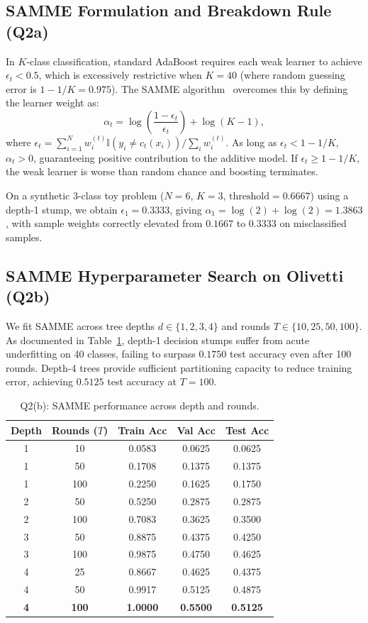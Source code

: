 \documentclass[10pt,twocolumn,letterpaper]{article}
\begin{document}
\subsection{SAMME Formulation and Breakdown Rule (Q2a)}
In $K$-class classification, standard AdaBoost requires each weak learner to achieve $\epsilon_t < 0.5$, which is excessively restrictive when $K=40$ (where random guessing error is $1 - 1/K = 0.975$). The SAMME algorithm~\cite{zhu2009multi} overcomes this by defining the learner weight as:
\begin{equation}
    \alpha_t = \log \left(\frac{1 - \epsilon_t}{\epsilon_t}\right) + \log(K - 1),
\end{equation}
where $\epsilon_t = \sum_{i=1}^N w_i^{(t)} \mathbb{I}(y_i \ne c_t(x_i)) / \sum_{i} w_i^{(t)}$. As long as $\epsilon_t < 1 - 1/K$, $\alpha_t > 0$, guaranteeing positive contribution to the additive model. If $\epsilon_t \ge 1 - 1/K$, the weak learner is worse than random chance and boosting terminates.

On a synthetic 3-class toy problem ($N=6$, $K=3$, $\text{threshold}=0.6667$) using a depth-1 stump, we obtain $\epsilon_1 = 0.3333$, giving $\alpha_1 = \log(2) + \log(2) = 1.3863$, with sample weights correctly elevated from $0.1667$ to $0.3333$ on misclassified samples.

\subsection{SAMME Hyperparameter Search on Olivetti (Q2b)}
We fit SAMME across tree depths $d \in \{1, 2, 3, 4\}$ and rounds $T \in \{10, 25, 50, 100\}$. As documented in Table~\ref{tab:q2b}, depth-1 decision stumps suffer from acute underfitting on 40 classes, failing to surpass $0.1750$ test accuracy even after 100 rounds. Depth-4 trees provide sufficient partitioning capacity to reduce training error, achieving $0.5125$ test accuracy at $T=100$.

\begin{table}[t]
\centering
\small
\caption{Q2(b): SAMME performance across depth and rounds.}
\label{tab:q2b}
\begin{tabular}{ccccc}
\toprule
Depth & Rounds ($T$) & Train Acc & Val Acc & Test Acc \\
\midrule
1 & 10 & 0.0583 & 0.0625 & 0.0625 \\
1 & 50 & 0.1708 & 0.1375 & 0.1375 \\
1 & 100 & 0.2250 & 0.1625 & 0.1750 \\
\midrule
2 & 50 & 0.5250 & 0.2875 & 0.2875 \\
2 & 100 & 0.7083 & 0.3625 & 0.3500 \\
\midrule
3 & 50 & 0.8875 & 0.4375 & 0.4250 \\
3 & 100 & 0.9875 & 0.4750 & 0.4625 \\
\midrule
4 & 25 & 0.8667 & 0.4625 & 0.4375 \\
4 & 50 & 0.9917 & 0.5125 & 0.4875 \\
\textbf{4} & \textbf{100} & \textbf{1.0000} & \textbf{0.5500} & \textbf{0.5125} \\
\bottomrule
\end{tabular}
\end{table}
\end{document}
